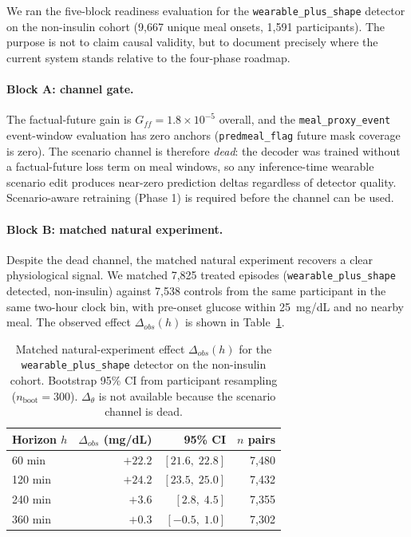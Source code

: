 We ran the five-block readiness evaluation for the \texttt{wearable\_plus\_shape} detector on the non-insulin cohort (9,667 unique meal onsets, 1,591 participants). The purpose is not to claim causal validity, but to document precisely where the current system stands relative to the four-phase roadmap.

\paragraph{Block A: channel gate.}
The factual-future gain is $G_{ff} = 1.8 \times 10^{-5}$ overall, and the \texttt{meal\_proxy\_event} event-window evaluation has zero anchors (\texttt{predmeal\_flag} future mask coverage is zero). The scenario channel is therefore \emph{dead}: the decoder was trained without a factual-future loss term on meal windows, so any inference-time wearable scenario edit produces near-zero prediction deltas regardless of detector quality. Scenario-aware retraining (Phase 1) is required before the channel can be used.

\paragraph{Block B: matched natural experiment.}
Despite the dead channel, the matched natural experiment recovers a clear physiological signal. We matched 7,825 treated episodes (\texttt{wearable\_plus\_shape} detected, non-insulin) against 7,538 controls from the same participant in the same two-hour clock bin, with pre-onset glucose within 25~mg/dL and no nearby meal. The observed effect $\Delta_{obs}(h)$ is shown in Table~\ref{tab:cf-natural-experiment}.

\begin{table}[t]
    \centering
    \caption{Matched natural-experiment effect $\Delta_{obs}(h)$ for the \texttt{wearable\_plus\_shape} detector on the non-insulin cohort. Bootstrap 95\% CI from participant resampling ($n_\text{boot} = 300$). $\Delta_\theta$ is not available because the scenario channel is dead.}
    \label{tab:cf-natural-experiment}
    \begin{tabular}{lrrr}
        \toprule
        Horizon $h$ & $\Delta_{obs}$ (mg/dL) & 95\% CI & $n$ pairs \\
        \midrule
        60 min  & $+22.2$ & $[21.6,\; 22.8]$ & 7{,}480 \\
        120 min & $+24.2$ & $[23.5,\; 25.0]$ & 7{,}432 \\
        240 min & $+3.6$  & $[2.8,\; 4.5]$   & 7{,}355 \\
        360 min & $+0.3$  & $[-0.5,\; 1.0]$  & 7{,}302 \\
        \bottomrule
    \end{tabular}
\end{table}

